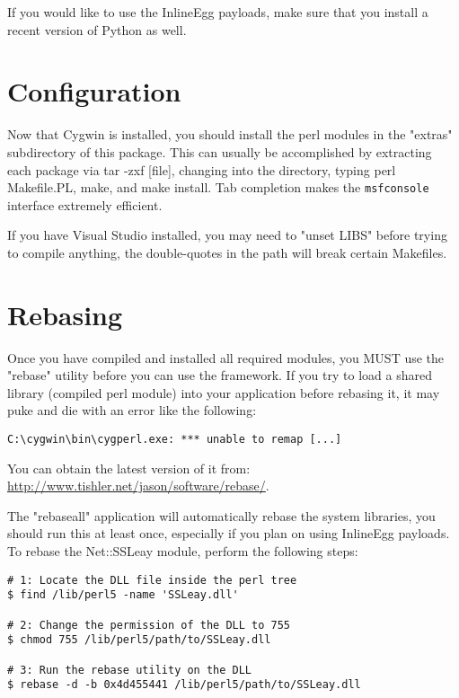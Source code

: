 \documentclass{report}
\begin{document}
\par
If you would like to use the InlineEgg payloads, make sure that you install a
recent version of Python as well.



	\section{Configuration}
\par
Now that Cygwin is installed, you should install the perl modules in the
"extras" subdirectory of this package. This can usually be accomplished by
extracting each package via tar -zxf [file], changing into the directory, typing
perl Makefile.PL, make, and make install. Tab completion makes the \texttt{msfconsole}
interface extremely efficient. 

\par
If you have Visual Studio installed, you may need to "unset LIBS" before trying
to compile anything, the double-quotes in the path will break certain Makefiles.


	\section{Rebasing}
\par
Once you have compiled and installed all required modules, you MUST use the
"rebase" utility before you can use the framework. If you try to load a shared
library (compiled perl module) into your application before rebasing it, it may
puke and die with an error like the following:

\begin{verbatim}
C:\cygwin\bin\cygperl.exe: *** unable to remap [...]
\end{verbatim}

\par
You can obtain the latest version of it from:
\url{http://www.tishler.net/jason/software/rebase/}.



\par
The "rebaseall" application will automatically rebase the system libraries, you
should run this at least once, especially if you plan on using InlineEgg payloads.
To rebase the Net::SSLeay module, perform the following steps:

\begin{verbatim}
# 1: Locate the DLL file inside the perl tree
$ find /lib/perl5 -name 'SSLeay.dll'

# 2: Change the permission of the DLL to 755
$ chmod 755 /lib/perl5/path/to/SSLeay.dll

# 3: Run the rebase utility on the DLL
$ rebase -d -b 0x4d455441 /lib/perl5/path/to/SSLeay.dll
\end{verbatim}
\end{document}
